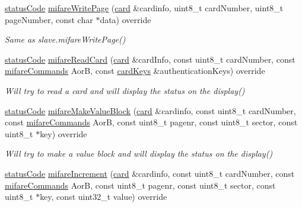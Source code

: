 \begin{DoxyCompactItemize}
\hyperlink{declarations_8h_ae1d20c5a38cae82ccaa6a77be3fd264b}{status\+Code} \hyperlink{classnfc_1_1NfcOled_a547e3a810432ebbb3e9a03dc7c2fa0c8}{mifare\+Write\+Page} (\hyperlink{classcard}{card} \&cardinfo, uint8\+\_\+t card\+Number, uint8\+\_\+t page\+Number, const char $\ast$data) override
\begin{DoxyCompactList}\small\item\em Same as slave.\+mifare\+Write\+Page() \end{DoxyCompactList}\item 
\mbox{\label{classnfc_1_1NfcOled_abed1963a7aaaa03737ecc7893abfbb23}} 
\hyperlink{declarations_8h_ae1d20c5a38cae82ccaa6a77be3fd264b}{status\+Code} \hyperlink{classnfc_1_1NfcOled_abed1963a7aaaa03737ecc7893abfbb23}{mifare\+Read\+Card} (\hyperlink{classcard}{card} \&card\+Info, const uint8\+\_\+t card\+Number, const \hyperlink{declarations_8h_a305b1a3bcfca65e2a82f0f9d24676835}{mifare\+Commands} AorB, const \hyperlink{structnfc_1_1cardKeys}{card\+Keys} \&authentication\+Keys) override
\begin{DoxyCompactList}\small\item\em Will try to read a card and will display the status on the display() \end{DoxyCompactList}\item 
\mbox{\label{classnfc_1_1NfcOled_a51057bf2bceb99fafeeaec0589470efb}} 
\hyperlink{declarations_8h_ae1d20c5a38cae82ccaa6a77be3fd264b}{status\+Code} \hyperlink{classnfc_1_1NfcOled_a51057bf2bceb99fafeeaec0589470efb}{mifare\+Make\+Value\+Block} (\hyperlink{classcard}{card} \&cardinfo, const uint8\+\_\+t card\+Number, const \hyperlink{declarations_8h_a305b1a3bcfca65e2a82f0f9d24676835}{mifare\+Commands} AorB, const uint8\+\_\+t pagenr, const uint8\+\_\+t sector, const uint8\+\_\+t $\ast$key) override
\begin{DoxyCompactList}\small\item\em Will try to make a value block and will display the status on the display() \end{DoxyCompactList}\item 
\mbox{\label{classnfc_1_1NfcOled_aa7bca4b2b6aeb113b9346f74d5d8e4b7}} 
\hyperlink{declarations_8h_ae1d20c5a38cae82ccaa6a77be3fd264b}{status\+Code} \hyperlink{classnfc_1_1NfcOled_aa7bca4b2b6aeb113b9346f74d5d8e4b7}{mifare\+Increment} (\hyperlink{classcard}{card} \&cardinfo, const uint8\+\_\+t card\+Number, const \hyperlink{declarations_8h_a305b1a3bcfca65e2a82f0f9d24676835}{mifare\+Commands} AorB, const uint8\+\_\+t pagenr, const uint8\+\_\+t sector, const uint8\+\_\+t $\ast$key, const uint32\+\_\+t value) override

\end{DoxyCompactItemize}
